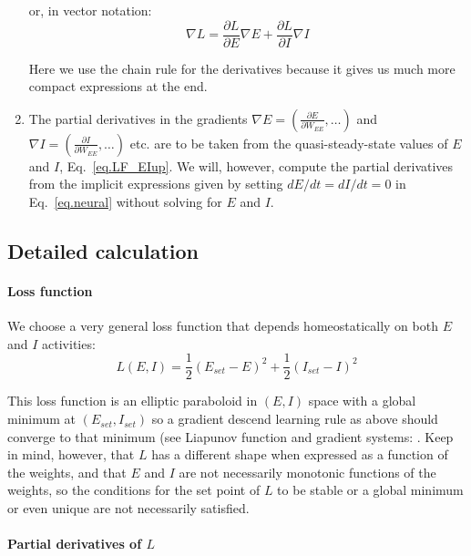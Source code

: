 \documentclass[twocolumn]{article}
\newcommand{\set}{\mathit{set}}
\begin{document}
\begin{enumerate}
\noindent or, in vector notation:
\begin{equation}
\nabla L = \frac{\partial L}{\partial E} \nabla E + \frac{\partial L}{\partial I} \nabla I
\label{eq.LF_partial}
\end{equation}

\noindent Here we use the chain rule for the derivatives because it gives us much more compact expressions at the end.

\item The partial derivatives in the gradients $\displaystyle \nabla E = \left(\frac{\partial E}{\partial W_{EE}}, \ldots \right)$ and $\displaystyle \nabla I = \left( \frac{\partial I}{\partial W_{EE}}, \ldots \right)$ etc. are to be taken from the quasi-steady-state values of $E$ and $I$, Eq.\ \ref{eq.LF_EIup}. We will, however, compute the partial derivatives from the implicit expressions given by setting $dE/dt=dI/dt=0$ in Eq.\ \ref{eq.neural} without solving for $E$ and $I$.
\end{enumerate}


\subsection{Detailed calculation}

\paragraph{Loss function}

We choose a very general loss function that depends homeostatically on both $E$ and $I$ activities:
\begin{equation}
L(E,I) = \frac{1}{2}(E_{set} - E)^2 + \frac{1}{2}(I_{set} - I)^2
\label{eq.LF_energy}
\end{equation}

\noindent This loss function is an elliptic paraboloid in $(E,I)$ space with a global minimum at $(E_{\set},I_{\set})$ so a gradient descend learning rule as above should converge to that minimum (see Liapunov function and gradient systems: \cite[Section 1.1B]{Wiggins1996}\cite[Sections 9.3 and 9.4]{Hirsch1974}\cite[Section 7.2]{Strogatz2018}. Keep in mind, however, that $L$ has a different shape when expressed as a function of the weights, and that $E$ and $I$ are not necessarily monotonic functions of the weights, so the conditions for the set point of $L$ to be stable or a global minimum or even unique are not necessarily satisfied.


\paragraph{Partial derivatives of $L$}
\end{document}
